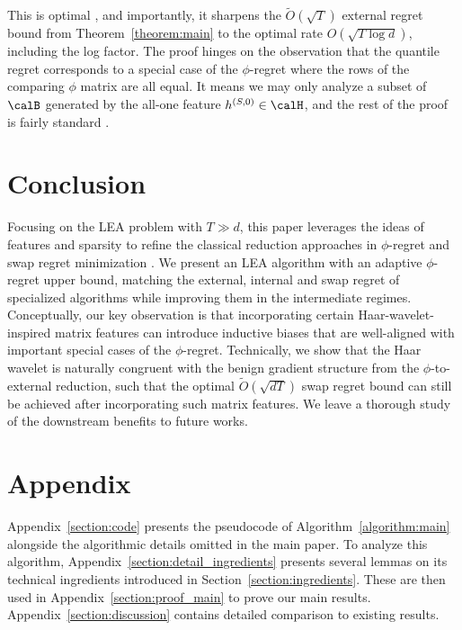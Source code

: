\documentclass[10pt]{article}
\begin{document}
This is optimal \citep{negrea2021minimax}, and importantly, it sharpens the $\tilde O(\sqrt{T})$ external regret bound from Theorem~\ref{theorem:main} to the optimal rate $O(\sqrt{T\log d})$, including the log factor. The proof hinges on the observation that the quantile regret corresponds to a special case of the $\phi$-regret where the rows of the comparing $\phi$ matrix are all equal. It means we may only analyze a subset of $\calB$ generated by the all-one feature $h^{(S,0)}\in\calH$, and the rest of the proof is fairly standard \citep[Chapter~9.6]{orabona2023modern}. 

\section{Conclusion}

Focusing on the LEA problem with $T\gg d$, this paper leverages the ideas of features and sparsity to refine the classical reduction approaches in $\phi$-regret and swap regret minimization \citep{blum2007external,gordon2008no}. We present an LEA algorithm with an adaptive $\phi$-regret upper bound, matching the external, internal and swap regret of specialized algorithms while improving them in the intermediate regimes. Conceptually, our key observation is that incorporating certain Haar-wavelet-inspired matrix features can introduce inductive biases that are well-aligned with important special cases of the $\phi$-regret. Technically, we show that the Haar wavelet is naturally congruent with the benign gradient structure from the $\phi$-to-external reduction, such that the optimal $\tilde O(\sqrt{dT})$ swap regret bound can still be achieved after incorporating such matrix features. We leave a thorough study of the downstream benefits to future works. 



\newpage
\section*{Appendix}
\appendix

Appendix~\ref{section:code} presents the pseudocode of Algorithm~\ref{algorithm:main} alongside the algorithmic details omitted in the main paper. To analyze this algorithm, Appendix~\ref{section:detail_ingredients} presents several lemmas on its technical ingredients introduced in Section~\ref{section:ingredients}. These are then used in Appendix~\ref{section:proof_main} to prove our main results. Appendix~\ref{section:discussion} contains detailed comparison to existing results. 
\end{document}
